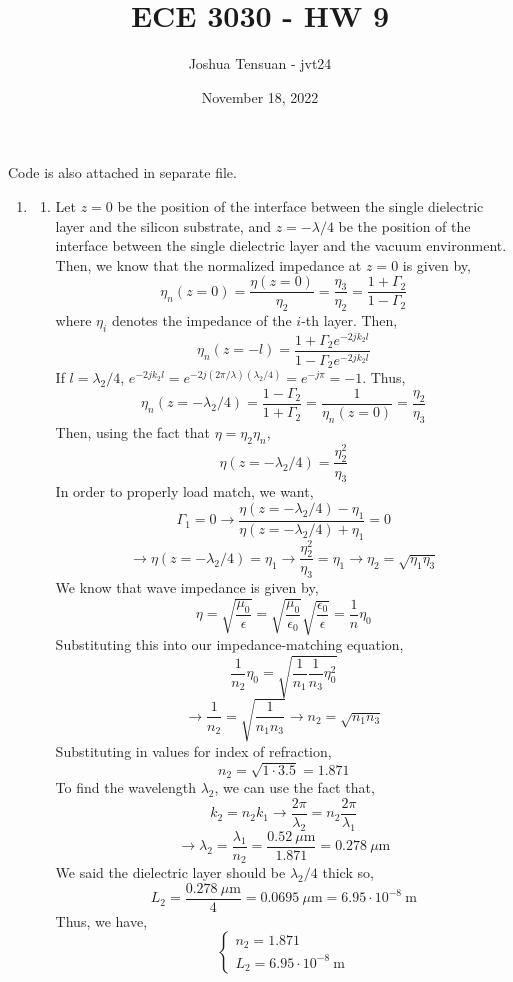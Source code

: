 \documentclass[12pt]{article}
\begin{document}
\usetikzlibrary{scopes}
\def\iangle{35} %

\def\down{-90}
\def\arcr{0.5cm} %

\title{ECE 3030 - HW 9}
\author{Joshua Tensuan - jvt24}
\date{November 18, 2022}
\maketitle


Code is also attached in separate file.
\begin{enumerate}
	\item [9.1]
	\begin{enumerate}
		\item [a.]
		Let $z=0$ be the position of the interface between the single dielectric layer and the silicon substrate, and $z=-\lambda/4$ be the position of the interface between the single dielectric layer and the vacuum environment.
		Then, we know that the normalized impedance at $z=0$ is given by,
		\[\eta_n(z=0)=\frac{\eta(z=0)}{\eta_2}=\frac{\eta_3}{\eta_2}=\frac{1+\Gamma_2}{1-\Gamma_2}\]
		where $\eta_i$ denotes the impedance of the $i$-th layer.
		Then,
		\[\eta_n(z=-l)=\frac{1+\Gamma_2e^{-2jk_2l}}{1-\Gamma_2e^{-2jk_2l}}\]
		If $l=\lambda_2/4$, $e^{-2jk_2l}=e^{-2j(2\pi/\lambda)(\lambda_2/4)}=e^{-j\pi}=-1$.
		Thus,
		\[\eta_n(z=-\lambda_2/4)=\frac{1-\Gamma_2}{1+\Gamma_2}=\frac{1}{\eta_n(z=0)}=\frac{\eta_2}{\eta_3}\]
		Then, using the fact that $\eta=\eta_2\eta_n$,
		\[\eta(z=-\lambda_2/4)=\frac{\eta_2^2}{\eta_3}\]
		In order to properly load match, we want,
		\[\Gamma_1 = 0 \to \frac{\eta(z=-\lambda_2/4)-\eta_1}{\eta(z=-\lambda_2/4)+\eta_1}=0\]
		\[\to \eta(z=-\lambda_2/4)=\eta_1 \to \frac{\eta_2^2}{\eta_3}=\eta_1\to \eta_2=\sqrt{\eta_1\eta_3}\]
		We know that wave impedance is given by,
		\[\eta=\sqrt{\frac{\mu_0}{\epsilon}}=\sqrt{\frac{\mu_0}{\epsilon_0}}\sqrt{\frac{\epsilon_0}{\epsilon}}=\frac{1}{n}\eta_0\]
		Substituting this into our impedance-matching equation,
		\[\frac{1}{n_2}\eta_0=\sqrt{\frac{1}{n_1}\frac{1}{n_3}\eta_0^2}\]
		\[\to \frac{1}{n_2}=\sqrt{\frac{1}{n_1n_3}}\to n_2=\sqrt{n_1n_3}\]
		Substituting in values for index of refraction,
		\[n_2=\sqrt{1\cdot 3.5} = 1.871\]
		To find the wavelength $\lambda_2$, we can use the fact that,
		\[k_2=n_2k_1\to \frac{2\pi}{\lambda_2}=n_2\frac{2\pi}{\lambda_1}\]
		\[\to \lambda_2=\frac{\lambda_1}{n_2}=\frac{0.52 \: \mu\mathrm{m}}{1.871}=0.278 \: \mu \mathrm{m}\]
		We said the dielectric layer should be $\lambda_2/4$ thick so,
		\[L_2 = \frac{0.278 \: \mu\mathrm{m}}{4}=0.0695\: \mu \mathrm{m}=6.95 \cdot 10^{-8}\:\mathrm{m}\]
		Thus, we have,
		\[\boxed{\begin{cases}
			n_2=1.871 \\ 
			L_2 = 6.95 \cdot 10^{-8}\:\mathrm{m}
		\end{cases}}\]


\end{enumerate}
\end{enumerate}
\end{document}
